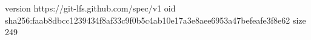 version https://git-lfs.github.com/spec/v1
oid sha256:faab8dbcc1239434f8af33c9f0b5c4ab10e17a3e8aee6953a47befeafe3f8e62
size 249
